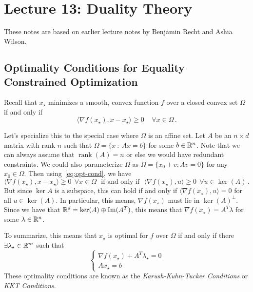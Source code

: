 \section{Lecture 13: Duality Theory}

These notes are based on earlier lecture notes by Benjamin Recht and Ashia
Wilson.

\subsection{Optimality Conditions for Equality Constrained Optimization}

Recall that $x_\star$ minimizes a smooth, convex function $f$ over a closed convex set $\Omega$ if and only if 
 \begin{equation}\label{eq:opt-cond}
  \langle \nabla f(x_\star), x - x_\star \rangle \geq 0 \;\;\;\; \forall x \in \Omega\,.
 \end{equation}

Let's specialize this to the special case where $\Omega$ is an affine set.  Let $A$ be an $n\times d$ matrix with rank $n$ such that $\Omega =\{x~:~Ax=b\}$ for some $b\in \mathbb{R}^n$.  Note that we can always assume that $\operatorname{rank}(A) = n$ or else we would have redundant constraints. We could also parameterize $\Omega$ as  $\Omega = \{x_0 + v : Av= 0\}$ for any $x_0\in \Omega$.  Then using~\eqref{eq:opt-cond}, we have
  \begin{equation*} 
  \langle \nabla f(x_\star), x - x_\star \rangle \geq 0  ~~\forall x \in \Omega~~~\mbox{if and only if}~~~
    \langle \nabla f(x_\star), u \rangle \geq 0 ~~\forall u \in \operatorname{ker}(A)\,.
    \end{equation*}
But since $\operatorname{ker}{A}$ is a subspace, this can hold if and only if  $\langle \nabla f(x_\star), u \rangle = 0$ for all $u \in \operatorname{ker}(A)$.  In particular, this means, $\nabla f(x_\star)$ must lie in $\operatorname{ker}(A)^\perp$.  Since we have that $\mathbb{R}^d = \operatorname{ker}(A) \oplus \operatorname{Im}(A^T)$, this means that $\nabla f(x_\star) = A^T \lambda$ for some $\lambda \in \mathbb{R}^n$.

To summarize, this means that $x_\star$ is optimal for $f$ over $\Omega$ if and only if there $\exists \lambda_\star \in \mathbb{R}^m$ such that 
$$ \begin{cases}
   \nabla f(x_\star) + A^T \lambda_\star  = 0\\
  Ax_\star = b 
  \end{cases}$$
These optimality conditions are known as the \emph{Karush-Kuhn-Tucker Conditions} or \emph{KKT Conditions}.


